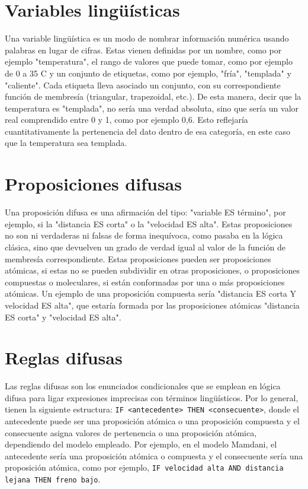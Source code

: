 \section{Variables lingüísticas}
\label{apx:VariablesLing}

Una variable lingüística es un modo de nombrar información numérica usando palabras en lugar de cifras. Estas vienen definidas por un nombre, como por ejemplo "temperatura", el rango de valores que puede tomar, como por ejemplo de 0 a 35 \textdegree{}C y un conjunto de etiquetas, como por ejemplo, "fría", "templada" y "caliente". Cada etiqueta lleva asociado un conjunto, con su correspondiente función de membresía (triangular, trapezoidal, etc.). De esta manera, decir que la temperatura es "templada", no sería una verdad absoluta, sino que sería un valor real comprendido entre 0 y 1, como por ejemplo 0,6. Esto reflejaría cuantitativamente la pertenencia del dato dentro de esa categoría, en este caso que la temperatura sea templada.

\section{Proposiciones difusas}
\label{apx:ProposicionesDifusas}

Una proposición difusa es una afirmación del tipo: "variable ES término", por ejemplo, si la "distancia ES corta" o la "velocidad ES alta". Estas proposiciones no son ni verdaderas ni falsas de forma inequívoca, como pasaba en la lógica clásica, sino que devuelven un grado de verdad igual al valor de la función de membresía correspondiente. Estas proposiciones pueden ser proposiciones atómicas, si estas no se pueden subdividir en otras proposiciones, o proposiciones compuestas o moleculares, si están conformadas por una o más proposiciones atómicas. Un ejemplo de una proposición compuesta sería "distancia ES corta Y velocidad ES alta", que estaría formada por las proposiciones atómicas "distancia ES corta" y "velocidad ES alta".

\section{Reglas difusas}
\label{apx:ReglasDifusas}

Las reglas difusas son los enunciados condicionales que se emplean en lógica difusa para ligar expresiones imprecisas con términos lingüísticos. Por lo general, tienen la siguiente estructura: \texttt{IF <antecedente> THEN <consecuente>}, donde el antecedente puede ser una proposición atómica o una proposición compuesta y el consecuente asigna valores de pertenencia o una proposición atómica, dependiendo del modelo empleado. Por ejemplo, en el modelo Mamdani, el antecedente sería una proposición atómica o compuesta y el consecuente sería una proposición atómica, como por ejemplo, \texttt{IF velocidad alta AND distancia lejana THEN freno bajo}.

